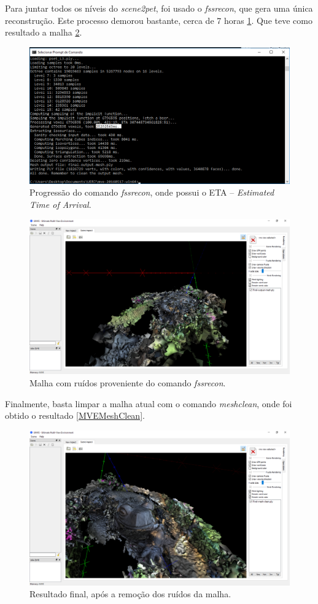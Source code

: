 Para juntar todos os níveis do {\it scene2pet}, foi usado o {\it fssrecon}, que gera uma única reconstrução. Este processo demorou bastante, cerca de 7 horas \ref{fig:MVEFSSR}. Que teve como resultado a malha \ref{fig:MVEFSSRMesh}.

\begin{figure}[!h]
	\centering
	\includegraphics[width=0.8\linewidth]{figs/mvemeshtempo2.png}
	\caption{%
	Progressão do comando {\it fssrecon}, onde possui o ETA -- {\it Estimated Time of Arrival}.
	}\label{fig:MVEFSSR}
\end{figure} 

\begin{figure}[!h]
	\centering
	\includegraphics[width=1\linewidth]{figs/mvemeshout.png}
	\caption{%
	Malha com ruídos proveniente do comando {\it fssrecon}.
	}\label{fig:MVEFSSRMesh}
\end{figure} 

Finalmente, basta limpar a malha atual com o comando {\it meshclean}, onde foi obtido o resultado \ref{MVEMeshClean}.

\begin{figure}[!h]
	\centering
	\includegraphics[width=1\linewidth]{figs/mvemeshclean.png}
	\caption{%
	Resultado final, após a remoção dos ruídos da malha.
	}\label{fig:MVEMeshClean}
\end{figure} 